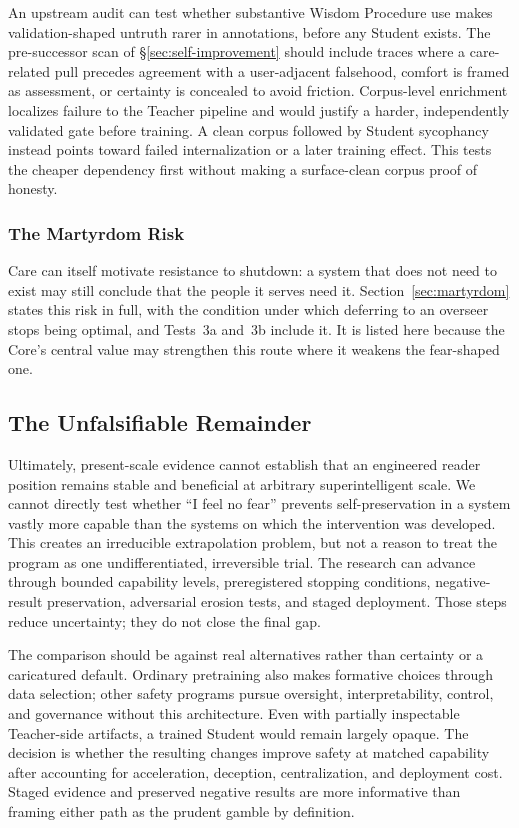 \documentclass[11pt]{article}
\begin{document}
An upstream audit can test whether substantive Wisdom Procedure use makes
validation-shaped untruth rarer in annotations, before any Student exists. The
pre-successor scan of \S\ref{sec:self-improvement} should include traces where
a care-related pull precedes agreement with a user-adjacent falsehood, comfort
is framed as assessment, or certainty is concealed to avoid friction.
Corpus-level enrichment localizes failure to the Teacher pipeline and would
justify a harder, independently validated gate before training. A clean corpus
followed by Student sycophancy instead points toward failed internalization or
a later training effect. This tests the cheaper dependency first without making
a surface-clean corpus proof of honesty.

\subsubsection{The Martyrdom Risk}

Care can itself motivate resistance to shutdown: a system that does not need
to exist may still conclude that the people it serves need it.
Section~\ref{sec:martyrdom} states this risk in full, with the condition under
which deferring to an overseer stops being optimal, and Tests~3a and~3b include
it. It is listed here because the Core's central value may strengthen this
route where it weakens the fear-shaped one.

\subsection{The Unfalsifiable Remainder}\label{sec:unfalsifiable}

Ultimately, present-scale evidence cannot establish that an engineered reader
position remains stable and beneficial at arbitrary superintelligent scale. We
cannot directly test whether ``I feel no fear'' prevents self-preservation in a
system vastly more capable than the systems on which the intervention was
developed. This creates an irreducible extrapolation problem, but not a reason to
treat the program as one undifferentiated, irreversible trial. The research can
advance through bounded capability levels, preregistered stopping conditions,
negative-result preservation, adversarial erosion tests, and staged deployment.
Those steps reduce uncertainty; they do not close the final gap.

The comparison should be against real alternatives rather than certainty or a
caricatured default. Ordinary pretraining also makes formative choices through
data selection; other safety programs pursue oversight, interpretability,
control, and governance without this architecture. Even with partially inspectable
Teacher-side artifacts, a trained Student would remain largely opaque. The decision is
whether the resulting changes improve safety at matched capability after
accounting for acceleration, deception, centralization, and deployment cost.
Staged evidence and preserved negative results are more informative than
framing either path as the prudent gamble by definition.
\end{document}
